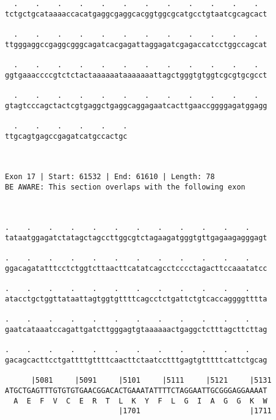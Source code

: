 \documentclass{article}
\begin{document}
\begin{Verbatim}
  .    .    .    .    .    .    .    .    .    .    .    .  
tctgctgcataaaaccacatgaggcgaggcacggtggcgcatgcctgtaatcgcagcact
                                                            
  .    .    .    .    .    .    .    .    .    .    .    .  
ttgggaggccgaggcgggcagatcacgagattaggagatcgagaccatcctggccagcat
                                                            
  .    .    .    .    .    .    .    .    .    .    .    .  
ggtgaaaccccgtctctactaaaaaataaaaaaattagctgggtgtggtcgcgtgcgcct
                                                            
  .    .    .    .    .    .    .    .    .    .    .    .  
gtagtcccagctactcgtgaggctgaggcaggagaatcacttgaaccggggagatggagg
                                                            
  .    .    .    .    .    .
ttgcagtgagccgagatcatgccactgc
                            
                            
 
Exon 17 | Start: 61532 | End: 61610 | Length: 78
BE AWARE: This section overlaps with the following exon



.    .    .    .    .    .    .    .    .    .    .    .    
tataatggagatctatagctagccttggcgtctagaagatgggtgttgagaagagggagt
                                                            
.    .    .    .    .    .    .    .    .    .    .    .    
ggacagatatttcctctggtcttaacttcatatcagcctcccctagacttccaaatatcc
                                                            
.    .    .    .    .    .    .    .    .    .    .    .    
atacctgctggttataattagtggtgttttcagcctctgattctgtcaccaggggtttta
                                                            
.    .    .    .    .    .    .    .    .    .    .    .    
gaatcataaatccagattgatcttgggagtgtaaaaaactgaggctctttagcttcttag
                                                            
.    .    .    .    .    .    .    .    .    .    .    .    
gacagcacttcctgattttgttttcaacttctaatcctttgagtgtttttcattctgcag
                                                            
      |5081     |5091     |5101     |5111     |5121     |5131
ATGCTGAGTTTGTGTGTGAACGGACACTGAAATATTTTCTAGGAATTGCGGGAGGAAAAT
  A  E  F  V  C  E  R  T  L  K  Y  F  L  G  I  A  G  G  K  W
                          |1701                         |1711
  

\end{Verbatim}
\end{document}
